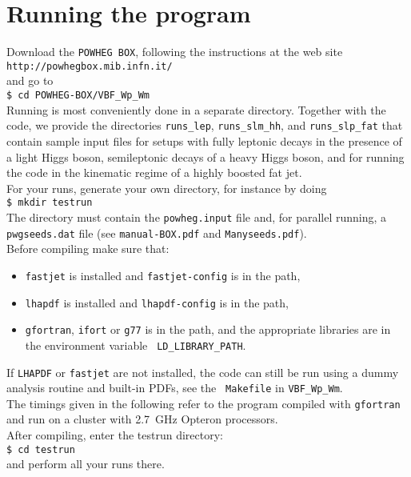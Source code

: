 \documentclass[a4paper,11pt]{article}
\begin{document}
\section*{Running the program}
%
Download the {\tt POWHEG BOX}, following the instructions at the web site 
\\[2ex]
{\tt http://powhegbox.mib.infn.it/}
\\[2ex] 
and go to 
\\[2ex]
{\tt \$ cd POWHEG-BOX/VBF\_Wp\_Wm}
\\[2ex]
Running is most conveniently done in a separate directory. Together with the code, we provide the directories {\tt runs\_lep}, {\tt runs\_slm\_hh}, and {\tt runs\_slp\_fat} that contain sample input files for setups with fully leptonic decays in the presence of a light Higgs boson, semileptonic decays of a heavy Higgs boson, and for running the code in the kinematic regime of a highly boosted fat jet. 
\\[2ex]
For your runs, generate your own directory, for instance by doing 
\\[2ex]
{\tt \$ mkdir testrun}
\\[2ex]
The directory must contain the {\tt powheg.input} file and, for
parallel running, a {\tt pwgseeds.dat} file (see {\tt manual-BOX.pdf}
and {\tt Manyseeds.pdf}).
\\[2ex]
Before compiling make sure that:
\begin{itemize}
\item 
{\tt fastjet} is installed and {\tt fastjet-config} is in the path,
\item 
{\tt lhapdf} is installed and {\tt lhapdf-config} is in the path,
\item
{\tt gfortran}, {\tt ifort} or {\tt g77} is in the path, and the
appropriate libraries are in the environment variable {\tt
  LD\_LIBRARY\_PATH}. 
\end{itemize}
%
If {\tt LHAPDF} or {\tt fastjet} are not installed, the code can still
be run using a dummy analysis routine and built-in PDFs, see the {\tt
  Makefile} in {\tt VBF\_Wp\_Wm}.
%
\\[2ex]
The timings given in the following refer to the program compiled with
{\tt gfortran} and run on a cluster with 2.7~GHz Opteron processors.
\\[2ex]
After compiling, enter the testrun directory:
\\[2ex]
{\tt \$ cd testrun}
\\[2ex]
and perform all your runs there. 
\\[2ex]
\end{document}

